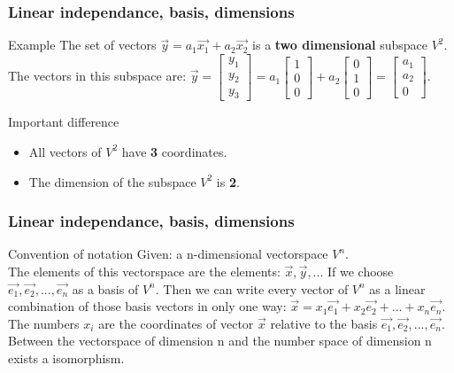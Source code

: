 \begin{frame}
	\frametitle{Linear independance, basis, dimensions}
	\begin{block}{Example}
		The set of vectors $\overrightarrow{y}=a_1\overrightarrow{x_1}+a_2\overrightarrow{x_2}$ is a {\bf two dimensional} subspace $V^2$.\\
		The vectors in this subspace are: $\overrightarrow{y}=\begin{bmatrix} y_1\\y_2\\y_3\end{bmatrix}=a_1\begin{bmatrix} 1\\0\\0\end{bmatrix}+ a_2\begin{bmatrix} 0\\1\\0\end{bmatrix}=\begin{bmatrix} a_1\\a_2\\0\end{bmatrix}$.
	\end{block}
	\begin{block}{Important difference}
		\begin{itemize}
			\item All vectors of $V^2$ have \textbf{3} coordinates.
			\item The dimension of the subspace $V^2$ is \textbf{2}.
		\end{itemize}
	\end{block}
\end{frame}

\begin{frame}
	\frametitle{Linear independance, basis, dimensions}
	\begin{block}{Convention of notation}
		Given: a n-dimensional vectorspace $V^n$.\\
		The elements of this vectorspace are the elements: $\overrightarrow{x},\overrightarrow{y},..$. If we choose $\overrightarrow{e_1},\overrightarrow{e_2},...,\overrightarrow{e_n}$ as a basis of $V^n$. Then we can write every vector of $V^n$ as a linear combination of those basis vectors in only one way: $\overrightarrow{x}=x_1\overrightarrow{e_1}+x_2\overrightarrow{e_2}+ ...+x_n\overrightarrow{e_n}$. The numbers $x_i$ are the coordinates of vector $\overrightarrow{x}$ relative to the basis $\overrightarrow{e_1},\overrightarrow{e_2},..., \overrightarrow{e_n}$.\vspace{5mm}
		Between the vectorspace of dimension n and the number space of dimension n exists a isomorphism.	
	\end{block}
\end{frame}

